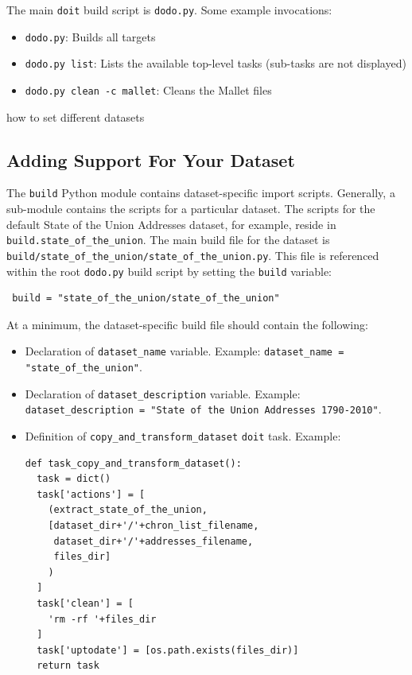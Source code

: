 The main \verb/doit/ build script is \verb/dodo.py/. Some example invocations:
\begin{itemize}
 \item \verb/dodo.py/: Builds all targets
 \item \verb/dodo.py list/: Lists the available top-level tasks (sub-tasks are not displayed)
 \item \verb/dodo.py clean -c mallet/: Cleans the Mallet files
\end{itemize}

%

how to set different datasets

\subsection{Adding Support For Your Dataset}
The \verb/build/ Python module contains dataset-specific import scripts.
Generally, a sub-module contains the scripts for a particular dataset. The
scripts for the default State of the Union Addresses dataset, for example,
reside in \verb/build.state_of_the_union/. The main build file for the dataset
is \verb#build/state_of_the_union/state_of_the_union.py#. This file is
referenced within the root \verb/dodo.py/ build script by setting the
\verb/build/ variable:
\begin{verbatim}
 build = "state_of_the_union/state_of_the_union"
\end{verbatim}

At a minimum, the dataset-specific build file should contain the following:
\begin{itemize}
 \item Declaration of \verb/dataset_name/ variable.
   \newline Example: \verb/dataset_name = "state_of_the_union"/.
 \item Declaration of \verb/dataset_description/ variable.
   \newline Example: \verb/dataset_description = "State of the Union Addresses 1790-2010"/.
 \item Definition of \verb/copy_and_transform_dataset/ \verb/doit/ task.
Example:
\begin{verbatim}
def task_copy_and_transform_dataset():
  task = dict()
  task['actions'] = [
    (extract_state_of_the_union,
    [dataset_dir+'/'+chron_list_filename,
     dataset_dir+'/'+addresses_filename,
     files_dir]
    )
  ]
  task['clean'] = [
    'rm -rf '+files_dir
  ]
  task['uptodate'] = [os.path.exists(files_dir)]
  return task
\end{verbatim}

\end{itemize}

